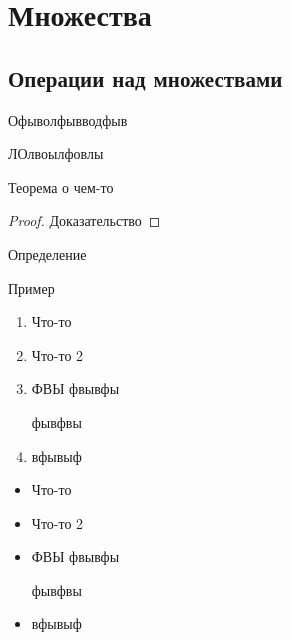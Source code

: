 



\chapter{Множества}


\section{Операции над множествами}


Офыволфывводфыв


ЛОлвоылфовлы


\begin{theorem}
    Теорема о чем-то
\end{theorem}

\begin{proof}
    Доказательство
\end{proof}

\begin{definition}
    Определение
\end{definition}

\begin{note}

\end{note}


\begin{notation}
    
\end{notation}

\begin{eg}
Пример
\end{eg}

\begin{enumerate}
    \item Что-то
    \item Что-то 2
    \item ФВЫ
    фвывфы

    фывфвы

    \item вфывыф
\end{enumerate}

\begin{itemize}
    \item Что-то
    \item Что-то 2
    \item ФВЫ
    фвывфы

    фывфвы

    \item вфывыф
\end{itemize}


